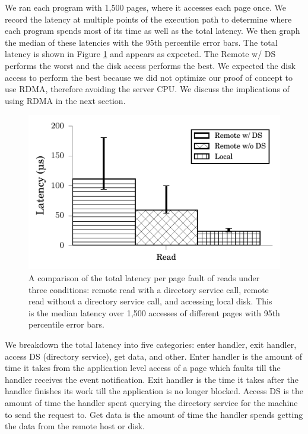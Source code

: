 We ran each program with 1,500 pages, where it accesses each page once. We record the latency at multiple points of the execution path to determine where each program spends most of its time as well as the total latency. We then graph the median of these latencies with the 95th percentile error bars. The total latency is shown in Figure \ref{fig:total_latency} and appears as expected. The Remote w/ DS performs the worst and the disk access performs the best. We expected the disk access to perform the best because we did not optimize our proof of concept to use RDMA, therefore avoiding the server CPU. We discuss the implications of using RDMA in the next section.

\begin{figure}[t]
    \centering
    \includegraphics{Graphs/Latency_Total_Comparison.pdf}
    \caption{A comparison of the total latency per page fault of reads under three conditions: remote read with a directory service call, remote read without a directory service call, and accessing local disk. This is the median latency over 1,500 accesses of different pages with 95th percentile error bars.}
    \label{fig:total_latency}
\end{figure}

We breakdown the total latency into five categories: enter handler, exit handler, access DS (directory service), get data, and other. Enter handler is the amount of time it takes from the application level access of a page which faults till the handler receives the event notification. Exit handler is the time it takes after the handler finishes its work till the application is no longer blocked. Access DS is the amount of time the handler spent querying the directory service for the machine to send the request to. Get data is the amount of time the handler spends getting the data from the remote host or disk. 

